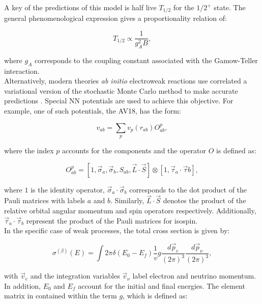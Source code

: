 \documentclass[openany]{book}
\begin{document}
A key of the predictions of this model is half live $T_{1/2}$ for the $1/2^{+}$ state. The general phenomenological expression gives a proportionality relation of: 

\begin{equation}\label{eq:micro_NCSH_beta_halflive}
	T_{1/2} \propto \frac{1}{g^2_A B},
\end{equation}

where $g_A$ corresponds to the coupling constant associated with the Gamow-Teller interaction.\\

Alternatively, modern theories \textit{ab initio} electroweak reactions use correlated a variational version of the stochastic  Monte Carlo method to make accurate predictions \cite{marcucci_nollett_schiavilla_wiringa_2006}. Special NN  potentials are used to achieve this objective. For example, one of such potentials, the AV18, has the form: 

\begin{equation}\label{eq:micro_modernTheories_AV18_NN}
	v_{ab} = \sum_{p} v_p(r_{ab}) O^{p}_{ab},
\end{equation}

where the index $p$ accounts for the components and the operator $O$ is defined as:

\begin{equation}\label{eq:micro_modernTheories_AV18_O}
	O^{p}_{ab} = [1, \vec \sigma_a, \vec \sigma_b, S_{ab}, \vec L \cdot \vec S ] \otimes [1, \vec \tau_a \cdot \vec \tau b],
\end{equation}

where $1$ is the identity operator, $\vec \sigma_a \cdot \vec \sigma_b$ corresponds to the dot product of the Pauli matrices with labels $a$ and $b$. Similarly, $\vec L \cdot \vec S$ denotes the product of the relative orbital angular momentum and spin operators respectively. Additionally, $\vec \tau_a \cdot \vec \tau_b$ represent the product of the Pauli matrices for isospin.  \\

In the specific case of weak processes, the total cross section is given by:

\begin{equation}\label{eq:micro_modernTheories_weak_crossSection}
	\sigma^{(\beta)} (E) = \int {2\pi \delta (E_0 - E_f) \frac{1}{v} 	{g \frac{d\vec p_e}{(2\pi)^3} \frac{d\vec p_\nu}{(2\pi)^3} }  },
\end{equation}

with $\vec v_e$ and the integration variables $\vec v_\nu$ label electron and neutrino momentum.   In addition, $E_0$ and $E_f$ account for the initial and final energies. The element matrix in contained within the term $g$, which is defined as:
\end{document}
